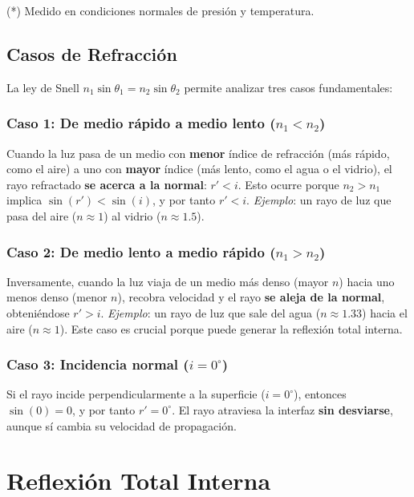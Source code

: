 \documentclass[12pt, a4paper]{article}
\theoremstyle{definition}
\begin{document}
{\small (*) Medido en condiciones normales de presión y temperatura.}

\subsection{Casos de Refracción}

La ley de Snell \(n_1 \sin\theta_1 = n_2 \sin\theta_2\) permite analizar tres casos fundamentales:

\subsubsection*{Caso 1: De medio rápido a medio lento (\(n_1 < n_2\))}

Cuando la luz pasa de un medio con \textbf{menor} índice de refracción (más rápido, como el
aire) a uno con \textbf{mayor} índice (más lento, como el agua o el vidrio), el rayo refractado
\textbf{se acerca a la normal}: \(r' < i\). Esto ocurre porque \(n_2 > n_1\) implica
\(\sin(r') < \sin(i)\), y por tanto \(r' < i\). \textit{Ejemplo}: un rayo de luz que pasa del
aire (\(n \approx 1\)) al vidrio (\(n \approx 1.5\)).

\subsubsection*{Caso 2: De medio lento a medio rápido (\(n_1 > n_2\))}

Inversamente, cuando la luz viaja de un medio más denso (mayor \(n\)) hacia uno menos denso
(menor \(n\)), recobra velocidad y el rayo \textbf{se aleja de la normal}, obteniéndose
\(r' > i\). \textit{Ejemplo}: un rayo de luz que sale del agua (\(n \approx 1.33\)) hacia el
aire (\(n \approx 1\)). Este caso es crucial porque puede generar la reflexión total interna.

\subsubsection*{Caso 3: Incidencia normal (\(i = 0^{\circ}\))}

Si el rayo incide perpendicularmente a la superficie (\(i = 0^{\circ}\)), entonces \(\sin(0) = 0\),
y por tanto \(r' = 0^{\circ}\). El rayo atraviesa la interfaz \textbf{sin desviarse}, aunque sí cambia
su velocidad de propagación.

\section{Reflexión Total Interna}
\label{sec:reflexion_total}
\end{document}

